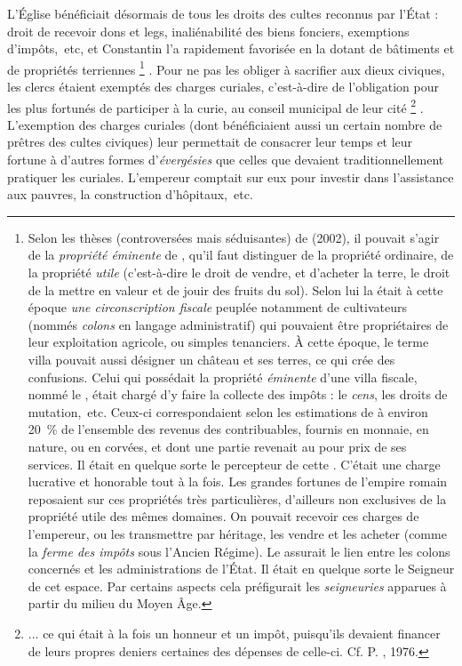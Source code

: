  L'Église bénéficiait désormais de tous les droits des cultes reconnus par l'État : droit de recevoir dons et legs, inaliénabilité des biens fonciers, exemptions d'impôts,~etc, et Constantin l'a rapidement favorisée en la dotant de bâtiments et de propriétés terriennes%
\footnote{Selon les thèses (controversées mais séduisantes) de  (2002), il pouvait s'agir de la \emph{propriété éminente} de , qu'il faut distinguer de la propriété ordinaire, de la propriété \emph{utile} (c'est-à-dire le droit de vendre, et d'acheter la terre, le droit de la mettre en valeur et de jouir des fruits du sol). Selon lui la  était à cette époque \emph{une circonscription fiscale} peuplée notamment de cultivateurs (nommés \emph{colons} en langage administratif) qui pouvaient être propriétaires de leur exploitation agricole, ou simples tenanciers. À cette époque, le terme villa pouvait aussi désigner un château et ses terres, ce qui crée des confusions. Celui qui possédait la propriété \emph{éminente} d'une villa fiscale, nommé le , était chargé d'y faire la collecte des impôts : le \emph{cens}, les droits de mutation,~etc. Ceux-ci correspondaient selon les estimations de  à environ 20~\% de l'ensemble des revenus des contribuables, fournis en monnaie, en nature, ou en corvées, et dont une partie revenait au  pour prix de ses services. Il était en quelque sorte le percepteur de cette . C'était une charge lucrative et honorable tout à la fois. Les grandes fortunes de l'empire romain reposaient sur ces propriétés très particulières, d'ailleurs non exclusives de la propriété utile des mêmes domaines. On pouvait recevoir ces charges de l'empereur, ou les transmettre par héritage, les vendre et les acheter (comme la \emph{ferme des impôts} sous l'Ancien Régime). Le  assurait le lien entre les colons concernés et les administrations de l'État. Il était en quelque sorte le Seigneur de cet espace. Par certains aspects cela préfigurait les \emph{seigneuries} apparues à partir du milieu du Moyen Âge.}%
. Pour ne pas les obliger à sacrifier aux dieux civiques, les clercs étaient exemptés des charges curiales, c'est-à-dire de l'obligation pour les plus fortunés de participer à la curie, au conseil municipal de leur cité%
\footnote{... ce qui était à la fois un honneur et un impôt, puisqu'ils devaient financer de leurs propres deniers certaines des dépenses de celle-ci. Cf. P. , 1976.} 
. L'exemption des charges curiales (dont bénéficiaient aussi un certain nombre de prêtres des cultes civiques) leur permettait de consacrer leur temps et leur fortune à d'autres formes d'\emph{évergésies} que celles que devaient traditionnellement pratiquer les curiales. L'empereur comptait sur eux pour investir dans l'assistance aux pauvres, la construction d'hôpitaux,~etc. 

